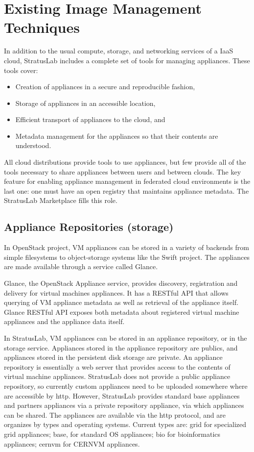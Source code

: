 \section{Existing Image Management Techniques}
\label{sec:other-approaches}

In addition to the usual compute, storage, and networking services of
a IaaS cloud, StratusLab includes a complete set of tools for managing
appliances.  These tools cover:
\begin{itemize}
\item Creation of appliances in a secure and reproducible fashion,
\item Storage of appliances in an accessible location,
\item Efficient transport of appliances to the cloud,
  and
\item Metadata management for the appliances so that their contents
  are understood.
\end{itemize}
All cloud distributions provide tools to use appliances, but few
provide all of the tools necessary to share appliances between users
and between clouds.  The key feature for enabling appliance management
in federated cloud environments is the last one: one must have an open
registry that maintains appliance metadata.  The StratusLab
Marketplace fills this role.

\subsection{Appliance Repositories (storage)}

In OpenStack project, VM appliances can be stored in a variety of
backends from simple filesystems to object-storage systems like the
Swift project. The appliances are made available through a service
called Glance.

Glance, the OpenStack Appliance service, provides discovery,
registration and delivery for virtual machines appliances. It has a
RESTful API that allows querying of VM appliance metadata as well as
retrieval of the appliance itself.  Glance RESTful API exposes both
metadata about registered virtual machine appliances and the appliance
data itself.

In StratusLab, VM appliances can be stored in an appliance repository,
or in the storage service. Appliances stored in the appliance
repository are publics, and appliances stored in the persistent disk
storage are private.  An appliance repository is essentially a web
server that provides access to the contents of virtual machine
appliances. StratusLab does not provide a public appliance repository,
so currently custom appliances need to be uploaded somewhere where are
accessible by http. However, StratusLab provides standard base
appliances and partners appliances via a private repository appliance,
via which appliances can be shared. The appliances are available via
the http protocol, and are organizes by types and operating systems.
Current types are: grid for specialized grid appliances; base, for
standard OS appliances; bio for bioinformatics appliances; cernvm for
CERNVM appliances.

